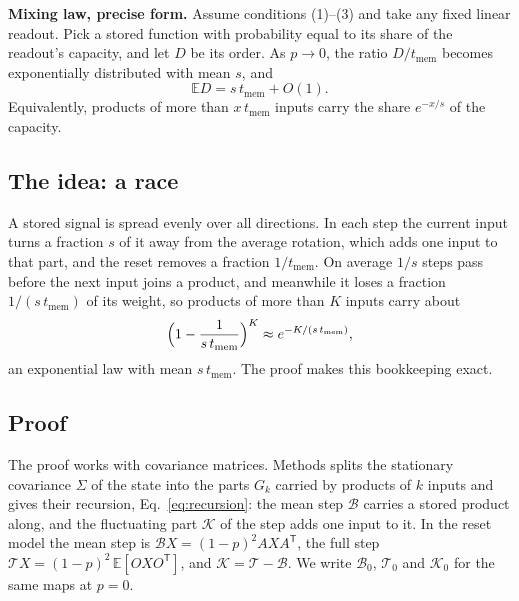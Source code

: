 \begin{keybox}
\textbf{Mixing law, precise form.} Assume conditions (1)--(3) and take any fixed linear readout. Pick a stored function
with probability equal to its share of the readout's capacity, and let $D$ be its order. As $p\to0$, the ratio
$D/t_{\mathrm{mem}}$ becomes exponentially distributed with mean $s$, and
\[\mathbb ED=s\,t_{\mathrm{mem}}+O(1).\]
Equivalently, products of more than $x\,t_{\mathrm{mem}}$ inputs carry the share $e^{-x/s}$ of the capacity.
\end{keybox}

\subsection{The idea: a race}
A stored signal is spread evenly over all directions. In each step the current input turns a fraction $s$ of it away
from the average rotation, which adds one input to that part, and the reset removes a fraction $1/t_{\mathrm{mem}}$.
On average $1/s$ steps pass before the next input joins a product, and meanwhile it loses a fraction
$1/(s\,t_{\mathrm{mem}})$ of its weight, so products of more than $K$ inputs carry about
\begin{equation*}
  \Bigl(1-\frac{1}{s\,t_{\mathrm{mem}}}\Bigr)^{K}\approx e^{-K/(s\,t_{\mathrm{mem}})} ,
\end{equation*}
an exponential law with mean $s\,t_{\mathrm{mem}}$. The proof makes this bookkeeping exact.

\subsection{Proof}
\label{app:proof}
The proof works with covariance matrices. Methods splits the stationary covariance $\Sigma$ of the state into the
parts $G_k$ carried by products of $k$ inputs and gives their recursion, Eq.~\eqref{eq:recursion}: the mean step
$\mathcal B$ carries a stored product along, and the fluctuating part $\mathcal K$ of the step adds one input to it.
In the reset model the mean step is $\mathcal BX=(1-p)^2AXA^{\mathsf T}$, the full step
$\mathcal TX=(1-p)^2\,\mathbb E[OXO^{\mathsf T}]$, and $\mathcal K=\mathcal T-\mathcal B$. We write $\mathcal B_0$,
$\mathcal T_0$ and $\mathcal K_0$ for the same maps at $p=0$.


